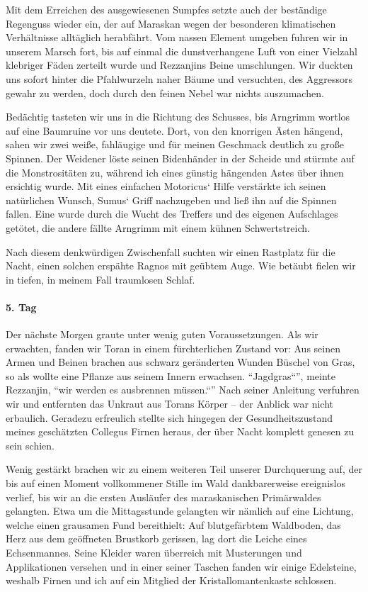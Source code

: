Mit dem Erreichen des ausgewiesenen Sumpfes setzte auch der beständige Regenguss wieder ein, der auf Maraskan wegen der besonderen klimatischen Verhältnisse alltäglich herabfährt. Vom nassen Element umgeben fuhren wir in unserem Marsch fort, bis auf einmal die dunstverhangene Luft von einer Vielzahl klebriger Fäden zerteilt wurde und Rezzanjins Beine umschlungen. Wir duckten uns sofort hinter die Pfahlwurzeln naher Bäume und versuchten, des Aggressors gewahr zu werden, doch durch den feinen Nebel war nichts auszumachen. 

Bedächtig tasteten wir uns in die Richtung des Schusses, bis Arngrimm wortlos auf eine Baumruine vor uns deutete. Dort, von den knorrigen Ästen hängend, sahen wir zwei weiße, fahläugige und für meinen Geschmack deutlich zu große Spinnen. Der Weidener löste seinen Bidenhänder in der Scheide und stürmte auf die Monstrositäten zu, während ich eines günstig hängenden Astes über ihnen ersichtig wurde. Mit eines einfachen Motoricus` Hilfe verstärkte ich seinen natürlichen Wunsch, Sumus` Griff nachzugeben und ließ ihn auf die Spinnen fallen. Eine wurde durch die Wucht des Treffers und des eigenen Aufschlages getötet, die andere fällte Arngrimm mit einem kühnen Schwertstreich. 

Nach diesem denkwürdigen Zwischenfall suchten wir einen Rastplatz für die Nacht, einen solchen erspähte Ragnos mit geübtem Auge. Wie betäubt fielen wir in tiefen, in meinem Fall traumlosen Schlaf.

\paragraph{5. Tag}
Der nächste Morgen graute unter wenig guten Voraussetzungen. Als wir erwachten, fanden wir Toran in einem fürchterlichen Zustand vor: Aus seinen Armen und Beinen brachen aus schwarz geränderten Wunden Büschel von Gras, so als wollte eine Pflanze aus seinem Innern erwachsen. ``Jagdgras``'', meinte Rezzanjin, ``wir werden es ausbrennen müssen.``'' Nach seiner Anleitung verfuhren wir und entfernten das Unkraut aus Torans Körper -- der Anblick war nicht erbaulich. Geradezu erfreulich stellte sich hingegen der Gesundheitszustand meines geschätzten Collegus Firnen heraus, der über Nacht komplett genesen zu sein schien. 

Wenig gestärkt brachen wir zu einem weiteren Teil unserer Durchquerung auf, der bis auf einen Moment vollkommener Stille im Wald dankbarerweise ereignislos verlief, bis wir an die ersten Ausläufer des maraskanischen Primärwaldes gelangten. Etwa um die Mittagsstunde gelangten wir nämlich auf eine Lichtung, welche einen grausamen Fund bereithielt: Auf blutgefärbtem Waldboden, das Herz aus dem geöffneten Brustkorb gerissen, lag dort die Leiche eines Echsenmannes. Seine Kleider waren überreich mit Musterungen und Applikationen versehen und in einer seiner Taschen fanden wir einige Edelsteine, weshalb Firnen und ich auf ein Mitglied der Kristallomantenkaste schlossen. 


